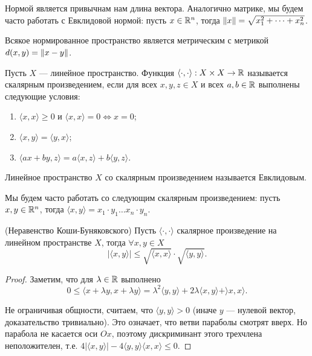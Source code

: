 \documentclass[a4paper]{article}
\theoremstyle{named}
\begin{document}
    Нормой является привычнам нам длина вектора. Аналогично матрике, мы будем часто работать с Евклидовой нормой: пусть $x \in \mathbb{R}^n$, тогда $\left\lVert x\right\rVert = \sqrt{x_1^2 + \dots + x_n^2}$.

    Всякое нормированное пространство является метрическим с метрикой $d(x, y) = \left\lVert x - y\right\rVert$.

    \begin{definition*}
        Пусть $X$ --- линейное пространство. Функция $\langle \cdot, \cdot \rangle: X \times X \to \mathbb{R}$ называется скалярным произведением, если для всех $x, y, z \in X$ и всех $a, b \in \mathbb{R}$ выполнены следующие условия:
        \begin{enumerate}
        \item $\langle x, x \rangle \geq 0$ и $\langle x, x \rangle = 0 \iff x = 0$;
        \item $\langle x, y \rangle = \langle y, x \rangle$;
        \item $\langle ax + by, z \rangle = a \langle x, z \rangle + b \langle y, z \rangle$.
        \end{enumerate}

        Линейное пространство $X$ со скалярным произведением называется Евклидовым.
    \end{definition*}

    Мы будем часто работать со следующим скалярным произведением: пусть $x, y \in \mathbb{R}^n$, тогда $\langle x, y \rangle = x_1 \cdot y_1 \dots x_n \cdot y_n$.

    \begin{lemma*} (Неравенство Коши-Буняковского) 
        Пусть $\langle \cdot, \cdot \rangle$ скалярное произведение на линейном пространстве $X$, тогда $\forall x, y \in X$
        \begin{equation*}
            |\langle x, y \rangle| \leq \sqrt{\langle x, x \rangle} \cdot \sqrt{\langle y, y \rangle}.
        \end{equation*}
    \end{lemma*}

    \begin{proof}
        Заметим, что для $\lambda \in \mathbb{R}$ выполнено
        \begin{equation*}
            0 \leq \langle x + \lambda y, x + \lambda y \rangle = \lambda^2 \langle y, y \rangle + 2\lambda \langle x, y \rangle + \rangle x, x \rangle.
        \end{equation*}

        Не ограничивая общности, считаем, что $\langle y, y \rangle > 0$ (иначе $y$ --- нулевой вектор, доказательство тривиально). Это означает, что ветви параболы смотрят вверх. Но парабола не касается оси $Ox$, поэтому дискриминант этого трехчлена неположителен, т.е. $4|\langle x, y \rangle| - 4\langle y, y \rangle \langle x, x \rangle \leq 0$.
    \end{proof}
\end{document}

